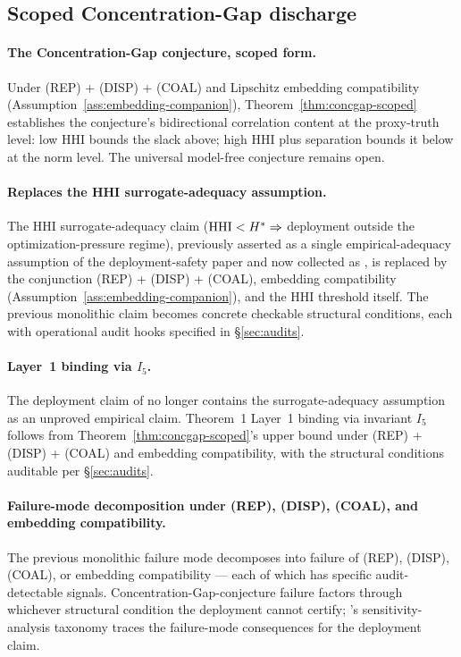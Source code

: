 \subsection{Scoped Concentration-Gap discharge}

\paragraph{The Concentration-Gap conjecture, scoped form.} Under
(REP) + (DISP) + (COAL) and Lipschitz embedding compatibility
(Assumption~\ref{ass:embedding-companion}),
Theorem~\ref{thm:concgap-scoped} establishes the conjecture's
bidirectional correlation content at the proxy-truth level: low
HHI bounds the slack above; high HHI plus separation bounds it
below at the norm level. The universal model-free conjecture
remains open.

\paragraph{Replaces the HHI surrogate-adequacy assumption.}
The HHI surrogate-adequacy claim ($\mathrm{HHI} < H^* \Rightarrow$
deployment outside the optimization-pressure regime), previously
asserted as a single empirical-adequacy assumption of the
deployment-safety paper and now collected as
\citep[Assumption~1]{lasser2026paper10}, is replaced by the
conjunction (REP) + (DISP) + (COAL), embedding compatibility
(Assumption~\ref{ass:embedding-companion}), and the HHI threshold
itself. The previous monolithic claim becomes concrete checkable
structural conditions, each with operational audit hooks specified
in \S\ref{sec:audits}.

\paragraph{Layer~1 binding via $I_5$.} The deployment claim of
\citep[Deployment Safety]{lasser2026paper10} no longer contains
the surrogate-adequacy assumption as an unproved empirical claim.
Theorem~1 Layer~1 binding via invariant $I_5$ follows from
Theorem~\ref{thm:concgap-scoped}'s upper bound under (REP) +
(DISP) + (COAL) and embedding compatibility, with the structural
conditions auditable per \S\ref{sec:audits}.

\paragraph{Failure-mode decomposition under (REP), (DISP), (COAL), and embedding compatibility.}
The previous monolithic failure mode decomposes into failure of
(REP), (DISP), (COAL), or embedding compatibility --- each of
which has specific audit-detectable signals.
Concentration-Gap-conjecture failure factors through whichever
structural condition the deployment cannot certify;
\citep[\S 10.2]{lasser2026paper10}'s sensitivity-analysis
taxonomy traces the failure-mode consequences for the deployment
claim.
